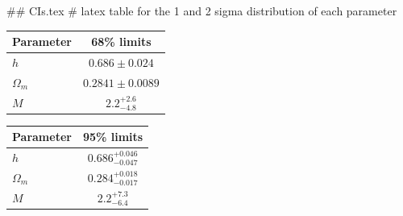 ## CIs.tex
# latex table for the 1 and 2 sigma distribution of each parameter

\begin{tabular} { l  c}
 Parameter &  68\% limits\\
\hline
{\boldmath$h              $} & $0.686\pm 0.024            $\\
{\boldmath$\Omega_m       $} & $0.2841\pm 0.0089          $\\
{\boldmath$M              $} & $2.2^{+2.6}_{-4.8}         $\\
\hline
\end{tabular}

\begin{tabular} { l  c}
 Parameter &  95\% limits\\
\hline
{\boldmath$h              $} & $0.686^{+0.046}_{-0.047}   $\\
{\boldmath$\Omega_m       $} & $0.284^{+0.018}_{-0.017}   $\\
{\boldmath$M              $} & $2.2^{+7.3}_{-6.4}         $\\
\hline
\end{tabular}
